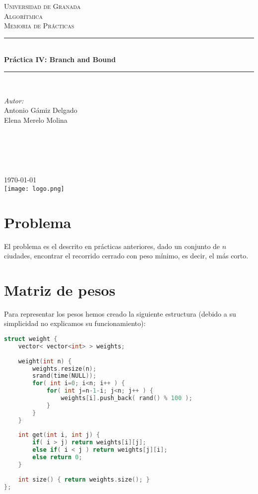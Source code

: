 \documentclass[11pt]{article}
\begin{document}
\begin{titlepage}
\newcommand{\HRule}{\rule{\linewidth}{0.5mm}}
\center
\textsc{\LARGE Universidad de Granada}\\[1.5cm] %
\textsc{\Large Algorítmica}\\[0.5cm] %
\textsc{\large Memoria de Prácticas}\\[0.5cm] %
\HRule \\[0.4cm]
{ \huge \bfseries Práctica IV: Branch and Bound}\\[0.4cm] %
\HRule \\[1.5cm]
\begin{minipage}{0.4\textwidth}
\begin{flushleft} \large
\emph{Autor:}\\
Antonio Gámiz Delgado\\
Elena Merelo Molina \textsc{} %
\end{flushleft}
\end{minipage}
~
\begin{minipage}{0.4\textwidth}
\begin{flushright} \large
\emph{} \\
\textsc{} %
\end{flushright}
\end{minipage}\\[2cm]
{\large \today}\\[2cm] %
\texttt{[image: logo.png]}\\[1cm]
\vfill %
\end{titlepage}

\section{Problema}

El problema es el descrito en prácticas anteriores, dado un conjunto de $n$ ciudades, encontrar el recorrido cerrado con peso mínimo, es decir, el más corto.

\section{Matriz de pesos}
Para representar los pesos hemos creado la siguiente estructura (debido a su simplicidad no explicamos su funcionamiento):
\begin{lstlisting}[language=C++, caption=Matriz de pesos]
struct weight {
	vector< vector<int> > weights;
	
	weight(int n) {
		weights.resize(n);
		srand(time(NULL));
		for( int i=0; i<n; i++ ) {
			for( int j=n-1-i; j<n; j++ ) {
				weights[i].push_back( rand() % 100 );
			}
		}
	}
	
	int get(int i, int j) {
		if( i > j) return weights[i][j];
		else if( i < j ) return weights[j][i];
		else return 0;
	}
	
	int size() { return weights.size(); }
};
\end{lstlisting}
\end{document}
